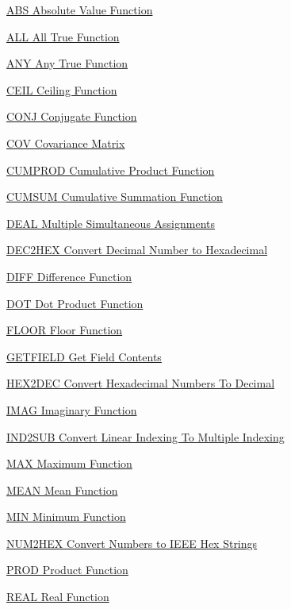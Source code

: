 
\begin{DoxyItemize}
\item \hyperlink{elementary_abs}{A\-B\-S Absolute Value Function}  
\item \hyperlink{elementary_all}{A\-L\-L All True Function}  
\item \hyperlink{elementary_any}{A\-N\-Y Any True Function}  
\item \hyperlink{elementary_ceil}{C\-E\-I\-L Ceiling Function}  
\item \hyperlink{elementary_conj}{C\-O\-N\-J Conjugate Function}  
\item \hyperlink{elementary_cov}{C\-O\-V Covariance Matrix}  
\item \hyperlink{elementary_cumprod}{C\-U\-M\-P\-R\-O\-D Cumulative Product Function}  
\item \hyperlink{elementary_cumsum}{C\-U\-M\-S\-U\-M Cumulative Summation Function}  
\item \hyperlink{elementary_deal}{D\-E\-A\-L Multiple Simultaneous Assignments}  
\item \hyperlink{elementary_dec2hex}{D\-E\-C2\-H\-E\-X Convert Decimal Number to Hexadecimal}  
\item \hyperlink{elementary_diff}{D\-I\-F\-F Difference Function}  
\item \hyperlink{elementary_dot}{D\-O\-T Dot Product Function}  
\item \hyperlink{elementary_floor}{F\-L\-O\-O\-R Floor Function}  
\item \hyperlink{elementary_getfield}{G\-E\-T\-F\-I\-E\-L\-D Get Field Contents}  
\item \hyperlink{elementary_hex2dec}{H\-E\-X2\-D\-E\-C Convert Hexadecimal Numbers To Decimal}  
\item \hyperlink{elementary_imag}{I\-M\-A\-G Imaginary Function}  
\item \hyperlink{elementary_ind2sub}{I\-N\-D2\-S\-U\-B Convert Linear Indexing To Multiple Indexing }  
\item \hyperlink{elementary_max}{M\-A\-X Maximum Function}  
\item \hyperlink{elementary_mean}{M\-E\-A\-N Mean Function}  
\item \hyperlink{elementary_min}{M\-I\-N Minimum Function}  
\item \hyperlink{elementary_num2hex}{N\-U\-M2\-H\-E\-X Convert Numbers to I\-E\-E\-E Hex Strings}  
\item \hyperlink{elementary_prod}{P\-R\-O\-D Product Function}  
\item \hyperlink{elementary_real}{R\-E\-A\-L Real Function}  

\end{DoxyItemize}
